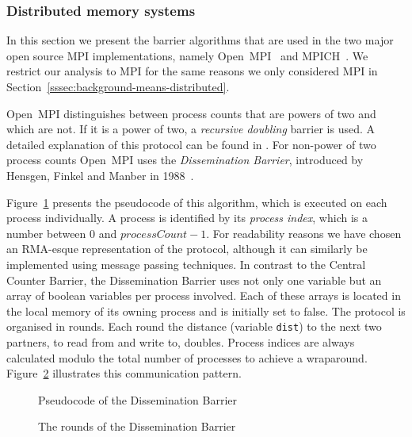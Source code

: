 \documentclass[a4paper, 10pt]{article}
\begin{document}
\subsubsection{Distributed memory systems}
\label{sssec:background-currently-used-distributed}

In this section we present the barrier algorithms that are used in the two major open source MPI implementations, namely Open~MPI~\cite{openmpi} and MPICH~\cite{mpich}. We restrict our analysis to MPI for the same reasons we only considered MPI in Section~\ref{sssec:background-means-distributed}.

Open~MPI distinguishes between process counts that are powers of two and which are not. If it is a power of two, a \emph{recursive doubling} barrier is used. A detailed explanation of this protocol can be found in \cite{hoefler2005}. For non-power of two process counts Open~MPI uses the \emph{Dissemination Barrier}, introduced by Hensgen, Finkel and Manber in 1988~\cite{hensgen1988}.

Figure~\ref{fig:pseudocode-dissemination} presents the pseudocode of this algorithm, which is executed on each process individually. A process is identified by its \emph{process index}, which is a number between 0 and $\mathit{processCount} - 1$. For readability reasons we have chosen an RMA-esque representation of the protocol, although it can similarly be implemented using message passing techniques.
In contrast to the Central Counter Barrier, the Dissemination Barrier uses not only one variable but an array of boolean variables per process involved. Each of these arrays is located in the local memory of its owning process and is initially set to false.
The protocol is organised in rounds. Each round the distance (variable \texttt{dist}) to the next two partners, to read from and write to, doubles. Process indices  are always calculated modulo the total number of processes to achieve a wraparound. Figure~\ref{fig:diagram-dissemination} illustrates this communication pattern.

\begin{figure}[htbp]
	\centering
	
	\caption{Pseudocode of the Dissemination Barrier}
	\label{fig:pseudocode-dissemination}
\end{figure}

\begin{figure}[htbp]
	\centering
	
	\caption{The rounds of the Dissemination Barrier}
	\label{fig:diagram-dissemination}
\end{figure}
\end{document}
